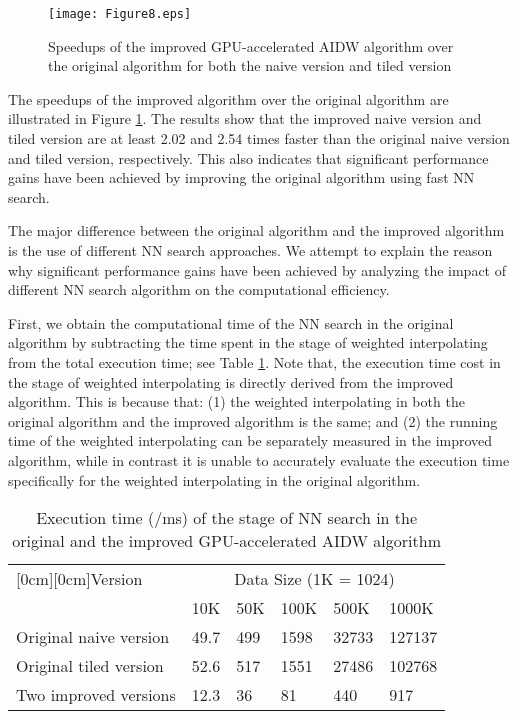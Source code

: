 \documentclass[final,5p,times,twocolumn,authoryear]{elsarticle}
\begin{document}
\begin{figure}[!h]
				\centering
				\texttt{[image: Figure8.eps]}
				\caption{Speedups of the improved GPU-accelerated AIDW algorithm 
					over the original algorithm for both the naive version and tiled version}
				\label{fig8}
			\end{figure}
			
			The speedups of the improved algorithm over the original algorithm are 
			illustrated in Figure \ref{fig8}. The results show that the improved naive version 
			and tiled version are at least 2.02 and 2.54 times faster than the original 
			naive version and tiled version, respectively. This also indicates that 
			significant performance gains have been achieved by improving the original 
			algorithm using fast NN search.
			
			The major difference between the original algorithm and the improved 
			algorithm is the use of different NN search approaches. We attempt to 
			explain the reason why significant performance gains have been achieved by analyzing 
			the impact of different NN search algorithm on the computational efficiency. 
			
			First, we obtain the computational time of the NN search in the original 
			algorithm by subtracting the time spent in the stage of weighted 
			interpolating from the total execution time; see Table \ref{tab3}. Note that, the 
			execution time cost in the stage of weighted interpolating is directly 
			derived from the improved algorithm. This is because that: (1) the weighted 
			interpolating in both the original algorithm and the improved algorithm is 
			the same; and (2) the running time of the weighted interpolating can be 
			separately measured in the improved algorithm, while in contrast it is 
			unable to accurately evaluate the execution time specifically for the 
			weighted interpolating in the original algorithm. 
			
			\begin{table}[htbp]
			\caption{Execution time (/ms) of the stage of NN search in the 
							original and the improved GPU-accelerated AIDW algorithm}
				\begin{center}
					\small
					\begin{tabular}{p{90pt}p{15pt}p{15pt}p{20pt}p{20pt}p{20pt}}
						\toprule
						\raisebox{-1.50ex}[0cm][0cm]{Version}& 
						\multicolumn{5}{c}{Data Size (1K = 1024)}  \\
						\cline{2-6} 
						& 
						10K& 
						50K& 
						100K& 
						500K& 
						1000K \\
						\midrule
						Original naive version& 
						49.7& 
						499& 
						1598& 
						32733& 
						127137 \\
						Original tiled version& 
						52.6& 
						517& 
						1551& 
						27486& 
						102768 \\
						Two improved versions& 
						12.3& 
						36& 
						81& 
						440& 
						917 \\
						\bottomrule
					\end{tabular}
					\label{tab3}
				\end{center}
			\end{table}
			
\end{document}
